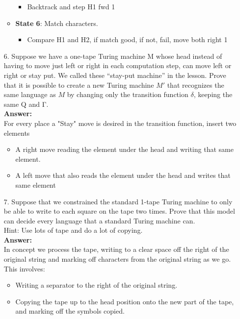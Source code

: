 \documentclass[12pt]{amsart}
\begin{document}
\begin{itemize}
\begin{itemize}
\begin{itemize}
\item Backtrack and step H1 fwd 1
\end{itemize}
\item \textbf{State 6}: Match characters.
\begin{itemize}
\item Compare H1 and H2, if match good, if not, fail, move both right 1
\end{itemize}
\end{itemize}
\vspace{.2in}
\item[{\rm 6.}] Suppose we have a one-tape Turing machine M whose head instead of having to move just left or right in each computation step, can move left or right or stay put.  We called these “stay-put machine” in the lesson.  Prove that it is possible to create a new Turing machine $M'$ that recognizes the same language as $M$ by changing only the transition function $\delta$, keeping the same Q and Γ.
\\[.2in]\textbf{Answer:}
\vspace{.2in}
\\For every place a "Stay" move is desired in the transition function, insert two elements
\begin{itemize}
\item A right move reading the element under the head and writing that same element.
\item A left move that also reads the element under the head and writes that same element
\end{itemize}
\vspace{.2in}
\item[{\rm 7.}] Suppose that we constrained the standard 1-tape Turing machine to only be able to write to each square on the tape two times.  Prove that this model can decide every language that a standard Turing machine can.
\\[.2in]Hint: Use lots of tape and do a lot of copying.
\\[.2in]\textbf{Answer:}
\\[.2in] In concept we process the tape, writing to a clear space off the right of the original string and marking off characters from the original string as we go. This involves:
\begin{itemize}
	\item Writing a separator to the right of the original string.
	\item Copying the tape up to the head position onto the new part of the tape, and marking off the symbols copied.

\end{itemize}
\end{itemize}
\end{document}
